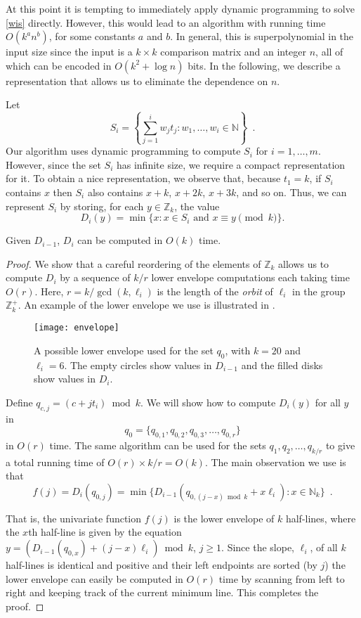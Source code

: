 \documentclass[lotsofwhite]{patmorin}
\newcommand{\Z}{\mathbb{Z}}
\newcommand{\N}{\mathbb{N}}
\newcommand{\defeq}{=}
\begin{document}
At this point it is tempting to immediately apply dynamic programming
to solve \eqref{wis} directly.  However, this would lead to an
algorithm with running time $O(k^a n^b)$, for some constants $a$ and
$b$.  In general, this is superpolynomial in the input size since the
input is a $k\times k$ comparison matrix and an integer $n$, all of
which can be encoded in $O(k^2 + \log n)$ bits.  In the following, we
describe a representation that allows us to eliminate the dependence
on $n$.

Let 
\[ S_i = \left\{\sum_{j=1}^i w_jt_j : 
        w_1,\ldots,w_i\in \mathbb{N} \right\} 
\enspace .
\]
Our algorithm uses dynamic programming to compute $S_i$ for
$i=1,\ldots,m$.  However, since the set $S_i$ has infinite size, we
require a compact representation for it.  To obtain a nice
representation, we observe that, because $t_1=k$, if $S_i$ contains
$x$ then $S_i$ also contains $x+k$, $x+2k$, $x+3k$, and so on.  Thus,
we can represent $S_i$ by storing, for each $y\in \Z_k$,
the value 
\[
   D_{i}(y) = \min \{x :\mbox{$x\in S_i$ and $x\equiv y\pmod k$}\}. 
\]
\begin{lem}
Given $D_{i-1}$, $D_i$ can be computed in $O(k)$ time.
\end{lem}

\begin{proof}
We show that a careful reordering of the elements of $\Z_k$ allows us
to compute $D_i$ by a sequence of $k/r$ lower envelope computations
each taking time $O(r)$.  Here, $r=k/\gcd(k,\ell_i)$ is the length of
the \emph{orbit} of $\ell_i$ in the group $\mathbb{Z}_k^+$.  An
example of the lower envelope we use is illustrated in
.

\begin{figure}
\begin{center}
\texttt{[image: envelope]}
\end{center}
\caption{A possible lower envelope used for the set $q_{0}$, with $k=20$
and $\ell_i=6$.   The empty circles show values in $D_{i-1}$ and
the filled disks show values in $D_i$.}
\end{figure}

Define $q_{c,j} = (c + jt_i)\bmod k$.  We will show how to compute
$D_{i}(y)$ for all $y$ in 
\[ 
    q_{0}=\{q_{0,1}, q_{0,2},q_{0,3},\ldots,q_{0,r}\}
\]
in $O(r)$ time.  The same algorithm can be used for the sets $q_{1},
q_{2}, \ldots, q_{k/r}$ to give a total running time of
$O(r)\times k/r= O(k)$.
The main observation we use is that
\begin{equation}
    f(j) \defeq D_{i}(q_{0,j}) = \min\{D_{i-1}(q_{0,(j-x)\bmod k}+x\ell_i) :
x\in \N_k\} \enspace .
\end{equation}

That is, the univariate function $f(j)$ is the lower
envelope of $k$ half-lines, where the $x$th half-line is given by the
equation $y=(D_{i-1}(q_{0,x}) + (j-x)\ell_i)\bmod k$, $j\ge 1$.  Since
the slope, $\ell_i$, of all $k$ half-lines is identical and positive and
their left endpoints are sorted (by $j$) the lower envelope can easily
be computed in $O(r)$ time by scanning from left to right and keeping
track of the current minimum line.  This completes the proof.
\end{proof}
\end{document}
